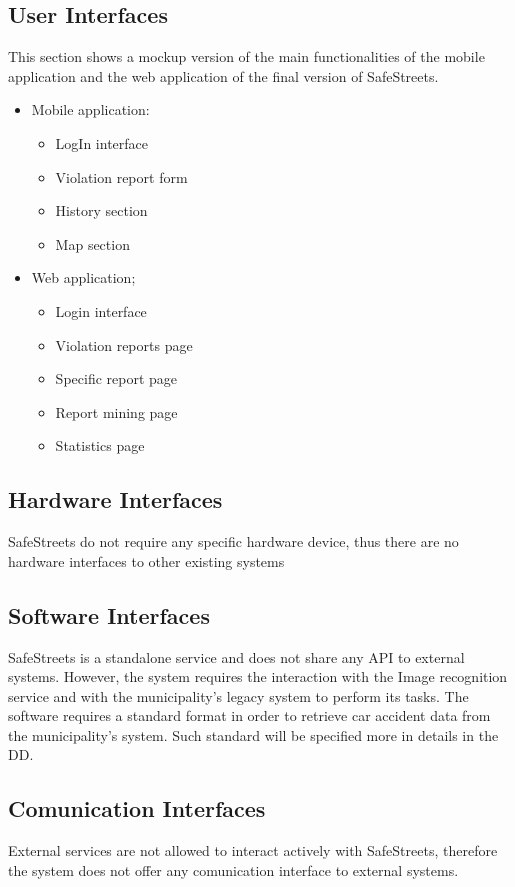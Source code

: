 \subsection{User Interfaces}
This section shows a mockup version of the main functionalities of the mobile application and the web application of the final version of SafeStreets.
\begin{itemize}
    \item Mobile application:
            \begin{itemize}
                \item LogIn interface
                \item Violation report form
                \item History section
                \item Map section
            \end{itemize}
    \item Web application;
            \begin{itemize}
                \item Login interface
                \item Violation reports page
                \item Specific report page
                \item Report mining page
                \item Statistics page
            \end{itemize}
\end{itemize}

\subsection{Hardware Interfaces}
SafeStreets do not require any specific hardware device, 
thus there are no hardware interfaces to other existing systems
\subsection{Software Interfaces}
SafeStreets is a standalone service and does not share any API to 
external systems. However, the system requires the interaction with the 
Image recognition service and with the municipality's legacy system
to perform its tasks. \newline
The software requires a standard format in order to retrieve car accident
data from the municipality's system. Such standard will be specified more 
in details in the DD.
\subsection{Comunication Interfaces}
External services are not allowed to interact actively with SafeStreets, therefore
the system does not offer any comunication interface to external systems.